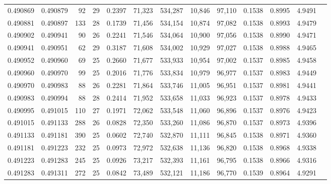 \begin{tabular}{rrrrrrrrrrrrr}
0.490869 & 0.490879 &  92 &  29 &                                     0.2397 &  71,323 & 534,287 &  10,846 &  97,110 & 0.1538 & 0.8995 & 4.9491 \\
0.490881 & 0.490897 & 133 &  28 &                                     0.1739 &  71,456 & 534,154 &  10,874 &  97,082 & 0.1538 & 0.8993 & 4.9479 \\
0.490902 & 0.490941 &  90 &  26 &                                     0.2241 &  71,546 & 534,064 &  10,900 &  97,056 & 0.1538 & 0.8990 & 4.9471 \\
0.490941 & 0.490951 &  62 &  29 &                                     0.3187 &  71,608 & 534,002 &  10,929 &  97,027 & 0.1538 & 0.8988 & 4.9465 \\
0.490952 & 0.490960 &  69 &  25 &                                     0.2660 &  71,677 & 533,933 &  10,954 &  97,002 & 0.1537 & 0.8985 & 4.9458 \\
0.490960 & 0.490970 &  99 &  25 &                                     0.2016 &  71,776 & 533,834 &  10,979 &  96,977 & 0.1537 & 0.8983 & 4.9449 \\
0.490970 & 0.490983 &  88 &  26 &                                     0.2281 &  71,864 & 533,746 &  11,005 &  96,951 & 0.1537 & 0.8981 & 4.9441 \\
0.490983 & 0.490994 &  88 &  28 &                                     0.2414 &  71,952 & 533,658 &  11,033 &  96,923 & 0.1537 & 0.8978 & 4.9433 \\
0.490995 & 0.491015 & 110 &  27 &                                     0.1971 &  72,062 & 533,548 &  11,060 &  96,896 & 0.1537 & 0.8976 & 4.9423 \\
0.491015 & 0.491133 & 288 &  26 &                                     0.0828 &  72,350 & 533,260 &  11,086 &  96,870 & 0.1537 & 0.8973 & 4.9396 \\
0.491133 & 0.491181 & 390 &  25 &                                     0.0602 &  72,740 & 532,870 &  11,111 &  96,845 & 0.1538 & 0.8971 & 4.9360 \\
0.491181 & 0.491223 & 232 &  25 &                                     0.0973 &  72,972 & 532,638 &  11,136 &  96,820 & 0.1538 & 0.8968 & 4.9338 \\
0.491223 & 0.491283 & 245 &  25 &                                     0.0926 &  73,217 & 532,393 &  11,161 &  96,795 & 0.1538 & 0.8966 & 4.9316 \\
0.491283 & 0.491311 & 272 &  25 &                                     0.0842 &  73,489 & 532,121 &  11,186 &  96,770 & 0.1539 & 0.8964 & 4.9291 \\

\end{tabular}

